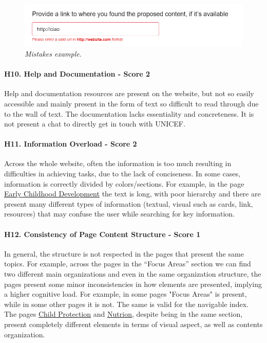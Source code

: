 \begin{figure}[h]
	\centering
	\begin{center}
		\includegraphics[width=\textwidth]{Picture13.png}
	\end{center}
	\captionsetup{font=small}
	\caption{\textit{Mistakes example.}}
	\label{fig:label13}
\end{figure}

\paragraph*{H10. Help and Documentation  - Score 2}
Help and documentation resources are present on the website, but not so easily accessible and mainly present in the form of text so difficult to read through due to the wall of text. The documentation lacks essentiality and concreteness. It is not present a chat to directly get in touch with UNICEF.

\newpage

\paragraph*{H11. Information Overload  - Score 2}
Across the whole website, often the information is too much resulting in difficulties in achieving tasks, due to the lack of conciseness. In some cases, information is correctly divided by colors/sections.
For example, in the page \href{https://www.unicef.org/early-childhood-development}{Early Childhood Development} the text is long, with poor hierarchy and there are present many different types of information (textual, visual such as cards, link, resources) that may confuse the user while searching for key information.

\paragraph*{H12. Consistency of Page Content Structure  - Score 1}
In general, the structure is not respected in the pages that present the same topics. For example, across the pages in the “Focus Areas” section we can find two different main organizations and even in the same organization structure, the pages present some minor inconsistencies in how elements are presented, implying a higher cognitive load.
For example, in some pages "Focus Areas" is present, while in some other pages it is not. The same is valid for the navigable index.
The pages \href{https://www.unicef.org/child-protection}{Child Protection} and \href{https://www.unicef.org/nutrition}{Nutrion}, despite being in the same section, present completely different elements in terms of visual aspect, as well as contents organization.

